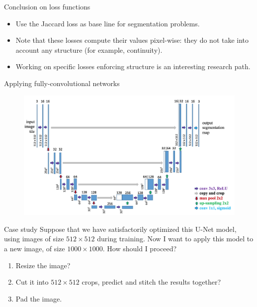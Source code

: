 \documentclass[xcolor=pdftex,dvipsnames,table,mathserif]{beamer}
\begin{document}
\begin{frame}{Conclusion on loss functions}

  \begin{itemize}
  \item Use the Jaccard loss as base line for segmentation problems.
  \item Note that these losses compute their values pixel-wise: they do not take into account any structure (for example, continuity).
  \item Working on specific losses enforcing structure is an interesting research path.
  \end{itemize}
\end{frame}


\begin{frame}{Applying fully-convolutional networks}

\begin{figure}[ht]
  \centering
  \includegraphics[height=0.30\textheight]{unet_lo}
\end{figure}


\begin{quizzblock}{Case study}
Suppose that we have satisfactorily optimized this U-Net model, using images of size $512 \times 512$ during training. Now I want to apply this model to a new image, of size $1000 \times 1000$. How should I proceed?
\end{quizzblock}

\begin{enumerate}
\item Resize the image?
\item Cut it into $512 \times 512$ crops, predict and stitch the results together?
\item Pad the image.
\end{enumerate}

\end{frame}
\end{document}
